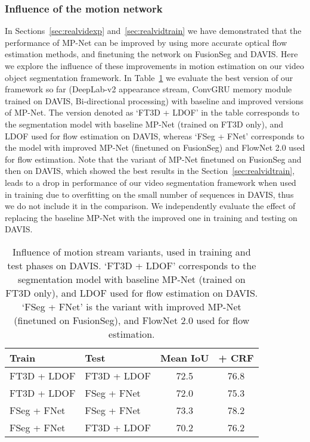 \subsubsection{Influence of the motion network}
\label{sec:mos}
In Sections~\ref{sec:realvidexp} and~\ref{sec:realvidtrain} we have
demonstrated that the performance of MP-Net can be improved by using more
accurate optical flow estimation methods, and finetuning the network on
FusionSeg and DAVIS. Here we explore the influence of these improvements in
motion estimation on our video object segmentation framework. 
In Table~\ref{tbl:mos} we evaluate the best version of our framework so far
(DeepLab-v2 appearance stream, ConvGRU memory module trained on DAVIS,
Bi-directional processing) with baseline and improved versions of MP-Net. The version denoted as `FT3D + LDOF' in the table corresponds to the segmentation model with baseline MP-Net (trained on FT3D only), and LDOF used
for flow estimation on DAVIS, whereas `FSeg + FNet' corresponds to the model with improved MP-Net (finetuned on FusionSeg) and FlowNet 2.0 used for flow estimation. Note
that the variant of MP-Net finetuned on FusionSeg and then on DAVIS, which showed the best results in the Section~\ref{sec:realvidtrain}, leads to a drop in performance of our video segmentation framework when used in training due to
overfitting on the small number of sequences in DAVIS, thus we do not include it in the comparison. We independently evaluate the effect of replacing the baseline MP-Net with the improved one in training and testing on DAVIS.
\begin{table}[t]
\begin{center}
\begin{tabular}{l|l| c |c}
\hline
Train & Test & Mean IoU & + CRF  \\
\hline
   FT3D + LDOF & FT3D + LDOF & 72.5 & 76.8  \\
   FT3D + LDOF & FSeg + FNet & 72.0 & 75.3  \\
  FSeg + FNet & FSeg + FNet  & 73.3 & 78.2  \\  
  FSeg + FNet & FT3D + LDOF  & 70.2 & 76.2  \\
  \hline
\end{tabular}
\caption{Influence of motion stream variants, used in training and test phases on DAVIS. `FT3D + LDOF' corresponds to the segmentation
model with baseline MP-Net (trained on FT3D only), and LDOF used for flow estimation on DAVIS. `FSeg + FNet' is the variant with improved MP-Net (finetuned on
FusionSeg), and FlowNet 2.0 used for flow estimation.}
\label{tbl:mos}
\end{center}
\end{table}

